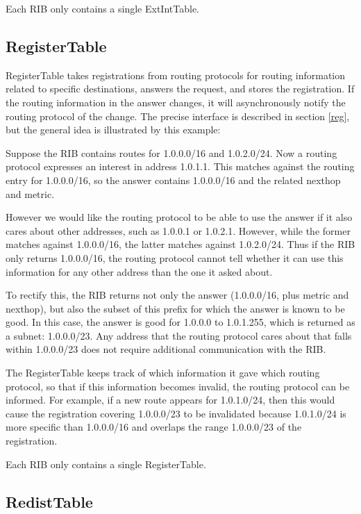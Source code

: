\documentclass[11pt]{article}
\begin{document}
Each RIB only contains a single ExtIntTable.

\subsection{RegisterTable}

RegisterTable takes registrations from routing protocols for routing
information related to specific destinations, answers the request, and
stores the registration.  If the routing information in the
answer changes, it will asynchronously notify the routing protocol of
the change.  The precise interface is described in section \ref{reg},
but the general idea is illustrated by this example:

Suppose the RIB contains routes for 1.0.0.0/16 and 1.0.2.0/24.  Now a
routing protocol expresses an interest in address 1.0.1.1.  This
matches against the routing entry for 1.0.0.0/16, so the answer contains
1.0.0.0/16 and the related nexthop and metric.

However we would like the routing protocol to be able to use the
answer if it also cares about other addresses, such as 1.0.0.1 or
1.0.2.1.  However, while the former matches against 1.0.0.0/16, the
latter matches against 1.0.2.0/24.  Thus if the RIB only returns
1.0.0.0/16, the routing protocol cannot tell whether it can use this
information for any other address than the one it asked about.

To rectify this, the RIB returns not only the answer (1.0.0.0/16, plus
metric and nexthop), but also the subset of this prefix for which the
answer is known to be good.  In this case, the answer is good for
1.0.0.0 to 1.0.1.255, which is returned as a subnet: 1.0.0.0/23.
Any address that the routing protocol cares about that falls within
1.0.0.0/23 does not require additional communication with the RIB.

The RegisterTable keeps track of which information it gave which
routing protocol, so that if this information becomes invalid, the
routing protocol can be informed.  For example, if a new route appears
for 1.0.1.0/24, then this would cause the registration covering
1.0.0.0/23 to be invalidated because 1.0.1.0/24 is more specific than
1.0.0.0/16 and overlaps the range 1.0.0.0/23 of the registration.

Each RIB only contains a single RegisterTable.

\subsection{RedistTable}
\end{document}
